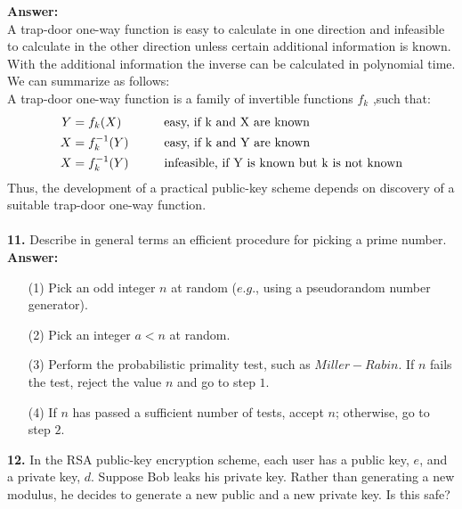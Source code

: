 \documentclass[paper=a4, fontsize=11pt]{scrartcl} %
\numberwithin{equation}{section} %
\numberwithin{figure}{section} %
\numberwithin{table}{section} %
\begin{document}
 \textbf{Answer:}\\

  A trap-door one-way function is easy to calculate in one direction and infeasible to calculate in the other direction unless certain additional information is known. With the additional information the inverse can be calculated in polynomial time. We can summarize as follows:\\
  A trap-door one-way function is a family of invertible functions $f_{k}$ ,such that:
  \begin{align}
  Y &= f_{k} (X) \hspace{1.2cm} \text{easy, if k and X are known}\\
  X &= f_{k}^{-1}(Y) \hspace{1cm} \text{easy, if k and Y are known}\\
  X &= f_{k}^{-1}(Y) \hspace{1cm} \text{infeasible, if Y is known but k is not known}
  \end{align}
  Thus, the development of a practical public-key scheme depends on discovery of a suitable trap-door one-way function.\\ \\



 \textbf{11.} Describe in general terms an efficient procedure for picking a prime number.\\

 \textbf{Answer:}

 \begin{enumerate}
 \item[(1)] Pick an odd integer $n$  at random ($e.g.$, using a pseudorandom number generator).
 \item[(2)] Pick an integer $a < n$  at random.
 \item[(3)]  Perform the probabilistic primality test, such as $Miller-Rabin$. If $n$ fails the test, reject the value $n$ and go to step $1$.
 \item[(4)] If $n$ has passed a sufficient number of tests, accept $n$; otherwise, go to step $2$.\\
 \end{enumerate}




 \textbf{12.} In the RSA public-key encryption scheme, each user has a public key, $e$, and a private key, $d$. Suppose Bob leaks his private key. Rather than generating a new modulus, he decides to generate a new public and a new private key. Is this safe?\\
\end{document}
